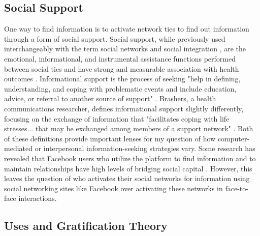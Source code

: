 \subsection{Social Support}

One way to find information is to activate network ties to find out information
through a form of social support. Social support, while previously used
interchangeably with the term social networks and social integration
\citep{houseStructuresProcessesSocial1988}, are the emotional, informational,
and instrumental assistance functions performed between social ties and have
strong and measurable association with health outcomes
\citep{houseMeasuresConceptsSocial1985, thoitsMechanismsLinkingSocial2011}.
Informational support is the process of seeking "help in defining,
understanding, and coping with problematic events and include education, advice,
or referral to another source of support" \citep[p. 640]{winemiller_etal93}.
Brashers, a health communications researcher, defines informational support
slightly differently, focusing on the exchange of information that "facilitates
coping with life stresses... that may be exchanged among members of a support
network" \citeyearpar[p. 260]{brashersInformationSeekingAvoiding2002}. Both of
these definitions provide important lenses for my question of how
computer-mediated or interpersonal information-seeking strategies vary. 
Some research has revealed that Facebook users who utilize the platform to 
find information and to maintain relationships have high levels of bridging
social capital \citep{liu2016meta}. However, this leaves the question 
of who activates their social networks for information using social networking 
sites like Facebook over activating these networks in face-to-face interactions. 


\subsection{Uses and Gratification Theory}

